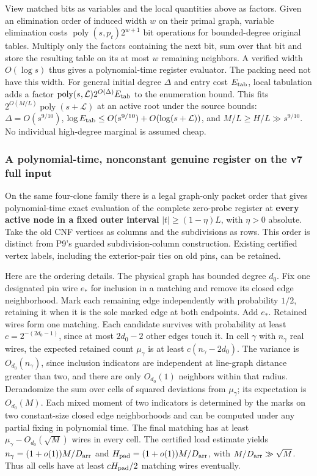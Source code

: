 \documentclass[
  11pt,
]{article}
\begin{document}
View matched bits as variables and the local quantities above as
factors. Given an elimination order of induced width \(w\) on their
primal graph, variable elimination costs
\(\operatorname{poly}(s,p_t)2^{w+1}\) bit operations for bounded-degree
original tables. Multiply only the factors containing the next bit, sum
over that bit and store the resulting table on its at most \(w\)
remaining neighbors. A verified width \(O(\log s)\) thus gives a
polynomial-time register evaluator. The packing need not have this
width. For general initial degree \(\Delta\) and entry cost
\(E_{\rm tab}\), local tabulation adds a factor
\(\operatorname{poly}(s,\mathcal L)2^{O(\Delta)}E_{\rm tab}\) to the
enumeration bound. This fits
\(2^{O(M/L)}\operatorname{poly}(s+\mathcal L)\) at an active root under
the source bounds: \(\Delta=O(s^{9/10})\),
\(\log E_{\rm tab}\le O(s^{9/10})+O(\log(s+\mathcal L))\), and
\(M/L\ge H/L\gg s^{9/10}\). No individual high-degree marginal is
assumed cheap.

\subsubsection{A polynomial-time, nonconstant genuine register on the v7
full
input}\label{v9-a-polynomial-time-nonconstant-genuine-register-on-the-v7-full-input}

On the same four-clone family there is a legal graph-only packet order
that gives polynomial-time exact evaluation of the complete zero-probe
register at \textbf{every active node in a fixed outer interval}
\(|t|\ge(1-\eta)L\), with \(\eta>0\) absolute. Take the old CNF vertices
as columns and the subdivisions as rows. This order is distinct from
P9's guarded subdivision-column construction. Existing certified vertex
labels, including the exterior-pair ties on old pins, can be retained.

Here are the ordering details. The physical graph has bounded degree
\(d_0\). Fix one designated pin wire \(e_*\) for inclusion in a matching
and remove its closed edge neighborhood. Mark each remaining edge
independently with probability \(1/2\), retaining it when it is the sole
marked edge at both endpoints. Add \(e_*\). Retained wires form one
matching. Each candidate survives with probability at least
\(c=2^{-(2d_0-1)}\), since at most \(2d_0-2\) other edges touch it. In
cell \(\gamma\) with \(n_\gamma\) real wires, the expected retained
count \(\mu_\gamma\) is at least \(c(n_\gamma-2d_0)\). The variance is
\(O_{d_0}(n_\gamma)\), since inclusion indicators are independent at
line-graph distance greater than two, and there are only \(O_{d_0}(1)\)
neighbors within that radius. Derandomize the sum over cells of squared
deviations from \(\mu_\gamma\); its expectation is \(O_{d_0}(M)\). Each
mixed moment of two indicators is determined by the marks on two
constant-size closed edge neighborhoods and can be computed under any
partial fixing in polynomial time. The final matching has at least
\(\mu_\gamma-O_{d_0}(\sqrt M)\) wires in every cell. The certified load
estimate yields \(n_\gamma=(1+o(1))M/D_{\rm arr}\) and
\(H_{\rm pad}=(1+o(1))M/D_{\rm arr}\), with \(M/D_{\rm arr}\gg\sqrt M\).
Thus all cells have at least \(c H_{\rm pad}/2\) matching wires
eventually.
\end{document}
